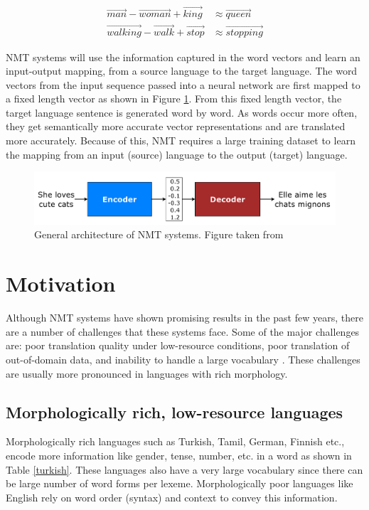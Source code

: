 \begin{align*}
\vec{man} - \vec{woman} + \vec{king} &  \approx \vec{queen} \\
\vec{walking} - \vec{walk} + \vec{stop} & \approx \vec{stopping}
\end{align*}



NMT systems will use the information captured in the word vectors and learn an input-output mapping, from a source language to the target language. The word vectors from the input sequence passed into a neural network are first mapped to a fixed length vector as shown in Figure \ref{enc_dec}. From this fixed length vector, the target language sentence is generated word by word. As words occur more often, they get semantically more accurate vector representations and are translated more accurately. %
Because of this, NMT requires a large training dataset to learn the mapping from an input (source) language to the output (target) language. 


\begin{figure}[ht]
	\centering
	\includegraphics[scale=0.27]{images/enc_dec}
	\caption{General architecture of NMT systems. Figure taken from \cite{luong2016neural}}
	\label{enc_dec}
\end{figure}

\section{Motivation}
Although NMT systems have shown promising results in the past few years, there are a number of challenges that these systems face. Some of the major challenges are: poor translation quality under low-resource conditions, poor translation of out-of-domain data, and inability to handle a large vocabulary \citep{koehn2017six}. These challenges are usually more pronounced in languages with rich morphology. 

\subsection{Morphologically rich, low-resource languages}
Morphologically rich languages such as Turkish, Tamil, German, Finnish etc., encode more information like gender, tense, number, etc. in a word as shown in Table \ref{turkish}. These languages also have a very large vocabulary since there can be large number of word forms per lexeme. Morphologically poor languages like English rely on word order (syntax) and context to convey this information. %



